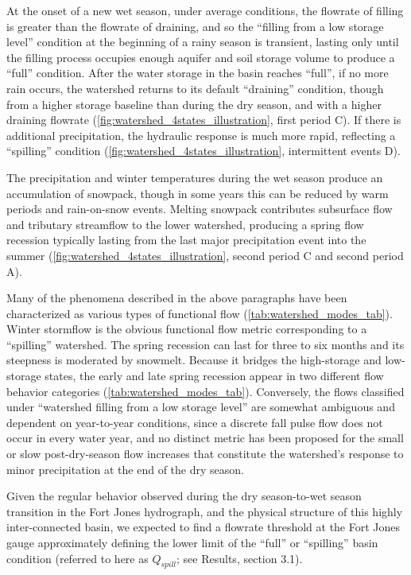 \documentclass[
]{article}
\begin{document}
At the onset of a new wet season, under average conditions, the flowrate
of filling is greater than the flowrate of draining, and so the
``filling from a low storage level'' condition at the beginning of a
rainy season is transient, lasting only until the filling process
occupies enough aquifer and soil storage volume to produce a ``full''
condition. After the water storage in the basin reaches ``full'', if no
more rain occurs, the watershed returns to its default ``draining''
condition, though from a higher storage baseline than during the dry
season, and with a higher draining flowrate
(\autoref{fig:watershed_4states_illustration}, first period C). If there
is additional precipitation, the hydraulic response is much more rapid,
reflecting a ``spilling'' condition
(\autoref{fig:watershed_4states_illustration}, intermittent events D).

The precipitation and winter temperatures during the wet season produce
an accumulation of snowpack, though in some years this can be reduced by
warm periods and rain-on-snow events. Melting snowpack contributes
subsurface flow and tributary streamflow to the lower watershed,
producing a spring flow recession typically lasting from the last major
precipitation event into the summer
(\autoref{fig:watershed_4states_illustration}, second period C and
second period A).

Many of the phenomena described in the above paragraphs have been
characterized as various types of functional flow
(\autoref{tab:watershed_modes_tab}). Winter stormflow is the obvious
functional flow metric corresponding to a ``spilling'' watershed. The
spring recession can last for three to six months and its steepness is
moderated by snowmelt. Because it bridges the high-storage and
low-storage states, the early and late spring recession appear in two
different flow behavior categories (\autoref{tab:watershed_modes_tab}).
Conversely, the flows classified under ``watershed filling from a low
storage level'' are somewhat ambiguous and dependent on year-to-year
conditions, since a discrete fall pulse flow does not occur in every
water year, and no distinct metric has been proposed for the small or
slow post-dry-season flow increases that constitute the watershed's
response to minor precipitation at the end of the dry season.

Given the regular behavior observed during the dry season-to-wet season
transition in the Fort Jones hydrograph, and the physical structure of
this highly inter-connected basin, we expected to find a flowrate
threshold at the Fort Jones gauge approximately defining the lower limit
of the ``full'' or ``spilling'' basin condition (referred to here as
\(Q_{spill}\); see Results, section 3.1).
\end{document}
